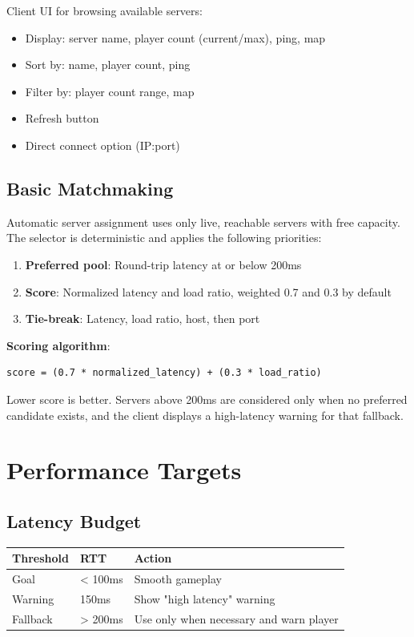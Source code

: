 \documentclass[11pt]{article}
\begin{document}
Client UI for browsing available servers:

\begin{itemize}
  \item Display: server name, player count (current/max), ping, map
  \item Sort by: name, player count, ping
  \item Filter by: player count range, map
  \item Refresh button
  \item Direct connect option (IP:port)
\end{itemize}

\subsection{Basic Matchmaking}

Automatic server assignment uses only live, reachable servers with free capacity. The selector is
deterministic and applies the following priorities:

\begin{enumerate}
  \item \textbf{Preferred pool}: Round-trip latency at or below 200ms
  \item \textbf{Score}: Normalized latency and load ratio, weighted 0.7 and 0.3 by default
  \item \textbf{Tie-break}: Latency, load ratio, host, then port
\end{enumerate}

\textbf{Scoring algorithm}:
\begin{verbatim}
score = (0.7 * normalized_latency) + (0.3 * load_ratio)
\end{verbatim}

Lower score is better. Servers above 200ms are considered only when no preferred candidate exists,
and the client displays a high-latency warning for that fallback.

\section{Performance Targets}

\subsection{Latency Budget}

\begin{longtable}{|>{\raggedright\arraybackslash}p{}|>{\raggedright\arraybackslash}p{}|>{\raggedright\arraybackslash}p{}|}
\hline
\textbf{Threshold} & \textbf{RTT} & \textbf{Action} \\
\hline
Goal & < 100ms & Smooth gameplay \\
\hline
Warning & 150ms & Show "high latency" warning \\
\hline
Fallback & > 200ms & Use only when necessary and warn player \\
\hline
\end{longtable}
\end{document}
